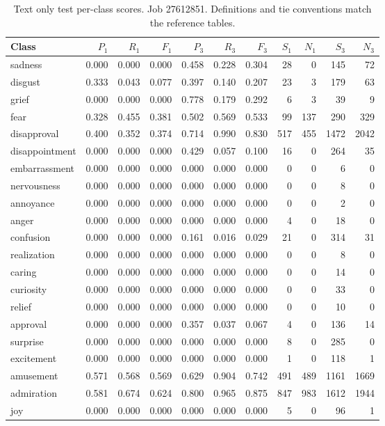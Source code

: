 \begin{table}[!htbp]
\centering
\scriptsize
\setlength{\tabcolsep}{5pt}
\begin{tabular}{lrrrrrrrrrr}
\toprule
Class & $P_1$ & $R_1$ & $F_1$ & $P_3$ & $R_3$ & $F_3$ & $S_1$ & $N_1$ & $S_3$ & $N_3$ \\
\midrule
sadness & 0.000 & 0.000 & 0.000 & 0.458 & 0.228 & 0.304 & 28 & 0 & 145 & 72 \\
disgust & 0.333 & 0.043 & 0.077 & 0.397 & 0.140 & 0.207 & 23 & 3 & 179 & 63 \\
grief & 0.000 & 0.000 & 0.000 & 0.778 & 0.179 & 0.292 & 6 & 3 & 39 & 9 \\
fear & 0.328 & 0.455 & 0.381 & 0.502 & 0.569 & 0.533 & 99 & 137 & 290 & 329 \\
disapproval & 0.400 & 0.352 & 0.374 & 0.714 & 0.990 & 0.830 & 517 & 455 & 1472 & 2042 \\
disappointment & 0.000 & 0.000 & 0.000 & 0.429 & 0.057 & 0.100 & 16 & 0 & 264 & 35 \\
embarrassment & 0.000 & 0.000 & 0.000 & 0.000 & 0.000 & 0.000 & 0 & 0 & 6 & 0 \\
nervousness & 0.000 & 0.000 & 0.000 & 0.000 & 0.000 & 0.000 & 0 & 0 & 8 & 0 \\
annoyance & 0.000 & 0.000 & 0.000 & 0.000 & 0.000 & 0.000 & 0 & 0 & 2 & 0 \\
anger & 0.000 & 0.000 & 0.000 & 0.000 & 0.000 & 0.000 & 4 & 0 & 18 & 0 \\
confusion & 0.000 & 0.000 & 0.000 & 0.161 & 0.016 & 0.029 & 21 & 0 & 314 & 31 \\
realization & 0.000 & 0.000 & 0.000 & 0.000 & 0.000 & 0.000 & 0 & 0 & 8 & 0 \\
caring & 0.000 & 0.000 & 0.000 & 0.000 & 0.000 & 0.000 & 0 & 0 & 14 & 0 \\
curiosity & 0.000 & 0.000 & 0.000 & 0.000 & 0.000 & 0.000 & 0 & 0 & 33 & 0 \\
relief & 0.000 & 0.000 & 0.000 & 0.000 & 0.000 & 0.000 & 0 & 0 & 10 & 0 \\
approval & 0.000 & 0.000 & 0.000 & 0.357 & 0.037 & 0.067 & 4 & 0 & 136 & 14 \\
surprise & 0.000 & 0.000 & 0.000 & 0.000 & 0.000 & 0.000 & 8 & 0 & 285 & 0 \\
excitement & 0.000 & 0.000 & 0.000 & 0.000 & 0.000 & 0.000 & 1 & 0 & 118 & 1 \\
amusement & 0.571 & 0.568 & 0.569 & 0.629 & 0.904 & 0.742 & 491 & 489 & 1161 & 1669 \\
admiration & 0.581 & 0.674 & 0.624 & 0.800 & 0.965 & 0.875 & 847 & 983 & 1612 & 1944 \\
joy & 0.000 & 0.000 & 0.000 & 0.000 & 0.000 & 0.000 & 5 & 0 & 96 & 1 \\
\bottomrule
\end{tabular}
\caption{Text only test per-class scores. Job 27612851. Definitions and tie conventions match the reference tables.}
\label{tab:classes-description_only}
\end{table}
